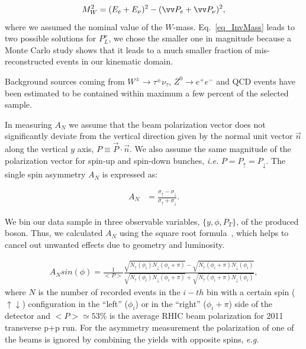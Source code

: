 \documentclass{PoS}
\begin{document}
\begin{equation}
\label{eq_InvMass}
M^{2}_{W}=(E_{e}+E_{\nu})^{2} - (\vv P_{e}+\vv P_{\nu})^{2},
\end{equation}
where we assumed the nominal value of the $W$-mass.  Eq.~\ref{eq_InvMass} leads to two possible solutions for $P_{L}^{\nu}$, we chose the smaller one in magnitude because a Monte Carlo study shows that it leads to a much smaller fraction of mis-reconstructed events in our kinematic domain.

Background sources coming from $W^{\pm}\rightarrow \tau^{\pm} \nu_{\tau}$, $Z^{0} \rightarrow e^{+}e^{-}$ and QCD events have been estimated to be contained within maximum a few percent of the selected sample.

In measuring $A_{N}$ we assume that the beam polarization vector does not significantly
deviate from the vertical direction given by the normal unit vector $\vec n$
along the vertical $y$ axis, $P \equiv \vec{P} \cdot \vec{n}$. 
We also assume the same magnitude of the polarization vector for
spin-up and spin-down bunches, \textit{i.e.} $P = P_\uparrow = P_\downarrow$.
The single spin asymmetry $A_N$ is expressed as:

\begin{align}
\label{eq_anapower}
A_N &= \frac{\sigma_\uparrow - \sigma_\downarrow}{\sigma_\uparrow +
   \sigma_\downarrow}.
\end{align}

We bin our data sample in three observable variables, $\{y, \phi, P_T\}$, of the produced boson. Thus, 
we calculated $A_{N}$ using the square root formula~\cite{sqrtFormula}, which helps to cancel out unwanted effects due to geometry and luminosity.

\begin{align}
A_{N } sin(\phi)= \frac{1}{<P>}
\frac{\sqrt{N_\uparrow(\phi_i)N_\downarrow(\phi_i+\pi)} - \sqrt{N_\uparrow(\phi_i+\pi)N_\downarrow(\phi_i)} } 
{\sqrt{N_\uparrow(\phi_i)N_\downarrow(\phi_i+\pi)} + \sqrt{N_\uparrow(\phi_i+\pi)N_\downarrow(\phi_i)}},
\end{align}
where $N$ is the number of recorded events in the $i-th$ bin with a certain spin ($\uparrow \downarrow$) configuration in the ``left'' ($\phi_{i}$) or in the ``right'' ($\phi_{i} + \pi$) side of the detector and $<P>\simeq 53\%$ is the average RHIC beam polarization for 2011 transverse p+p run.  
For the asymmetry measurement the polarization of one of the beams is ignored by combining the
yields with opposite spins, \textit{e.g.}
\end{document}
